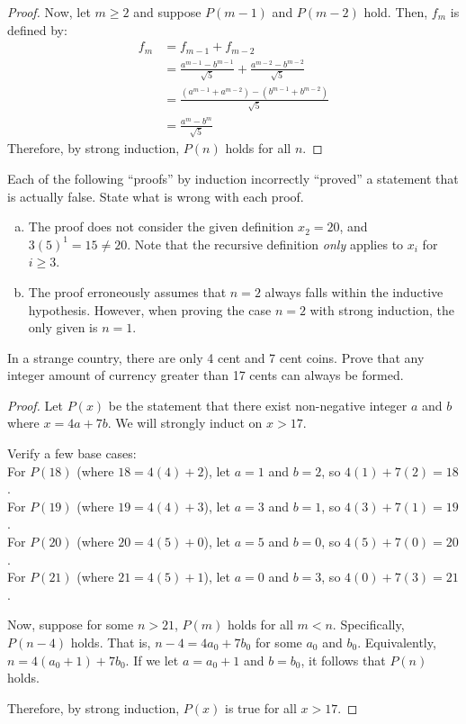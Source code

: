 \begin{enumerate}[(a)]
\begin{proof}
          Now, let $m \geq 2$ and suppose $P(m-1)$ and $P(m-2)$ hold. Then, $f_m$ is defined by:
          \begin{align*}
            f_m & = f_{m-1} + f_{m-2}                                                   \\
                & = \frac{a^{m-1}-b^{m-1}}{\sqrt{5}} + \frac{a^{m-2}-b^{m-2}}{\sqrt{5}} \\
                & = \frac{(a^{m-1} + a^{m-2}) - (b^{m-1} + b^{m-2})}{\sqrt{5}}          \\
                & = \frac{a^m - b^m}{\sqrt{5}}
          \end{align*}
          Therefore, by strong induction, $P(n)$ holds for all $n$.
        \end{proof}
\end{enumerate}


\question Each of the following ``proofs'' by induction incorrectly ``proved'' a statement that is actually false.
State what is wrong with each proof.
\begin{enumerate}[(a)]
  \item The proof does not consider the given definition $x_2=20$, and $3(5)^1 = 15 \neq 20$.
        Note that the recursive definition \emph{only} applies to $x_i$ for $i \geq 3$.
  \item The proof erroneously assumes that $n=2$ always falls within the inductive hypothesis.
        However, when proving the case $n=2$ with strong induction, the only given is $n=1$.
\end{enumerate}


\question In a strange country, there are only 4 cent and 7 cent coins.
Prove that any integer amount of currency greater than 17 cents can always be formed.
\begin{proof}
  Let $P(x)$ be the statement that there exist non-negative integer $a$ and $b$ where $x=4a+7b$.
  We will strongly induct on $x > 17$.

  Verify a few base cases: \\
  For $P(18)$ (where $18 = 4(4)+2$), let $a=1$ and $b=2$, so $4(1)+7(2)=18$. \\
  For $P(19)$ (where $19 = 4(4)+3$), let $a=3$ and $b=1$, so $4(3)+7(1)=19$. \\
  For $P(20)$ (where $20 = 4(5)+0$), let $a=5$ and $b=0$, so $4(5)+7(0)=20$. \\
  For $P(21)$ (where $21 = 4(5)+1$), let $a=0$ and $b=3$, so $4(0)+7(3)=21$.

  Now, suppose for some $n > 21$, $P(m)$ holds for all $m < n$.
  Specifically, $P(n-4)$ holds.
  That is, $n-4 = 4a_0 + 7b_0$ for some $a_0$ and $b_0$.
  Equivalently, $n = 4(a_0+1) + 7b_0$.
  If we let $a = a_0+1$ and $b = b_0$, it follows that $P(n)$ holds.


  Therefore, by strong induction, $P(x)$ is true for all $x > 17$.
\end{proof}


